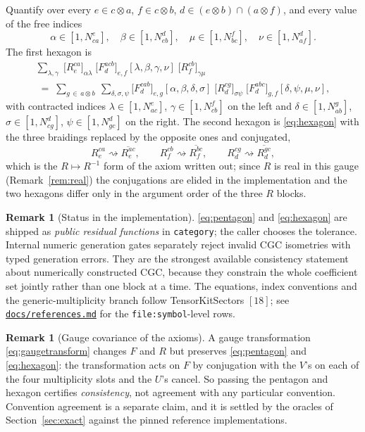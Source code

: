 \documentclass[11pt,a4paper]{article}
\theoremstyle{plain}
\theoremstyle{definition}
\newtheorem{remark}[theorem]{Remark}
\newcommand{\code}[1]{\texttt{#1}}
\newcommand{\refsmd}{\href{https://github.com/Ryo-wtnb11/fusion-symbols/blob/main/docs/references.md}{\code{docs/references.md}}}
\begin{document}
Quantify over every
$e\in c\otimes a$, $f\in c\otimes b$, $d\in (e\otimes b)\cap(a\otimes f)$, and
every value of the free indices
\[
  \alpha\in[1,N^e_{ca}],\quad \beta\in[1,N^d_{eb}],\quad
  \mu\in[1,N^f_{bc}],\quad \nu\in[1,N^d_{af}].
\]
The first hexagon is
\begin{multline}\label{eq:hexagon}
  \sum_{\lambda,\gamma}\;
    \bigl[R^{ca}_{e}\bigr]_{\alpha\lambda}\;
    \bigl[F^{acb}_{d}\bigr]_{e,f}[\lambda,\beta,\gamma,\nu]\;
    \bigl[R^{cb}_{f}\bigr]_{\gamma\mu}
  \\[0.3em]
  \;=\;
  \sum_{g\,\in\, a\otimes b}\ \sum_{\delta,\sigma,\psi}
    \bigl[F^{cab}_{d}\bigr]_{e,g}[\alpha,\beta,\delta,\sigma]\;
    \bigl[R^{cg}_{d}\bigr]_{\sigma\psi}\;
    \bigl[F^{abc}_{d}\bigr]_{g,f}[\delta,\psi,\mu,\nu] ,
\end{multline}
with contracted indices $\lambda\in[1,N^e_{ac}]$, $\gamma\in[1,N^f_{cb}]$ on
the left and $\delta\in[1,N^g_{ab}]$, $\sigma\in[1,N^d_{cg}]$,
$\psi\in[1,N^d_{gc}]$ on the right. The second hexagon is
\eqref{eq:hexagon} with the three braidings replaced by the opposite ones and
conjugated,
\[
  R^{ca}_e \rightsquigarrow \overline{R^{ac}_e},\qquad
  R^{cb}_f \rightsquigarrow \overline{R^{bc}_f},\qquad
  R^{cg}_d \rightsquigarrow \overline{R^{gc}_d},
\]
which is the $R\mapsto R^{-1}$ form of the axiom written out; since $R$ is real
in this gauge (Remark~\ref{rem:real}) the conjugations are elided in the
implementation and the two hexagons differ only in the argument order of the
three $R$ blocks.

\begin{remark}[Status in the implementation]
\eqref{eq:pentagon} and \eqref{eq:hexagon} are shipped as \emph{public
residual functions} in \code{category}; the caller chooses the tolerance.
Internal numeric generation gates separately reject invalid CGC isometries
with typed generation errors. They
are the strongest available consistency statement about numerically constructed
CGC, because they constrain the whole coefficient set jointly rather than one
block at a time. The equations, index conventions and the generic-multiplicity
branch follow TensorKitSectors $[18]$; see \refsmd{} for the
\code{file:symbol}-level rows.
\end{remark}

\begin{remark}[Gauge covariance of the axioms]
A gauge transformation \eqref{eq:gaugetransform} changes $F$ and $R$ but
preserves \eqref{eq:pentagon} and \eqref{eq:hexagon}: the transformation acts
on $F$ by conjugation with the $V$'s on each of the four multiplicity slots and
the $U$'s cancel. So passing the pentagon and hexagon certifies
\emph{consistency}, not agreement with any particular convention. Convention
agreement is a separate claim, and it is settled by the oracles of
Section~\ref{sec:exact} against the pinned reference implementations.
\end{remark}
\end{document}
